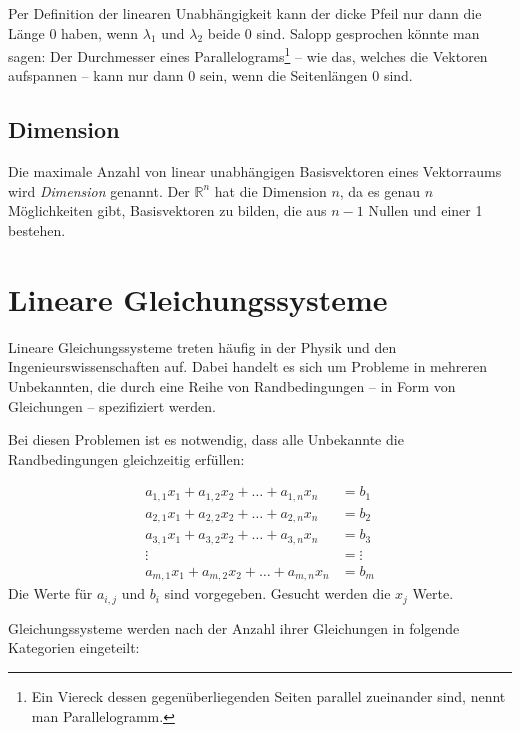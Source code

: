 \bigskip

Per Definition der linearen Unabhängigkeit kann der dicke Pfeil nur dann die Länge 0 haben, wenn $\lambda_1$ und $\lambda_2$ beide 0 sind. Salopp gesprochen könnte man sagen: Der Durchmesser eines Parallelograms\footnote{Ein Viereck dessen gegenüberliegenden Seiten parallel zueinander sind, nennt man Parallelogramm.} -- wie das, welches die Vektoren aufspannen -- kann nur dann 0 sein, wenn die Seitenlängen 0 sind.

\subsection{Dimension}

\begin{definition}
Die maximale Anzahl von linear unabhängigen Basisvektoren eines Vektorraums wird \textsl{Dimension} genannt. Der $\mathbb{R}^n$ hat die Dimension $n$, da es genau $n$ Möglichkeiten gibt, Basisvektoren zu bilden, die aus $n-1$ Nullen und einer 1 bestehen.
\end{definition}


\section{Lineare Gleichungssysteme}

Lineare Gleichungssysteme treten häufig in der Physik und den Ingenieurswissenschaften auf. Dabei handelt es sich um Probleme in mehreren Unbekannten, die durch eine Reihe von Randbedingungen -- in Form von Gleichungen -- spezifiziert werden.

Bei diesen Problemen ist es notwendig, dass alle Unbekannte die Randbedingungen gleichzeitig erfüllen:

\begin{equation}\label{eq:syseq}
\begin{split}
a_{1,1}x_1 + a_{1,2}x_2 + \dots + a_{1,n}x_n &= b_1 \\
a_{2,1}x_1 + a_{2,2}x_2 + \dots + a_{2,n}x_n &= b_2 \\
a_{3,1}x_1 + a_{3,2}x_2 + \dots + a_{3,n}x_n &= b_3 \\
\vdots &= \vdots \\
a_{m,1}x_1 + a_{m,2}x_2 + \dots + a_{m,n}x_n &= b_m 
\end{split}
\end{equation}
Die Werte für $a_{i,j}$ und $b_{i}$ sind vorgegeben. Gesucht werden die $x_j$ Werte. 

Gleichungssysteme werden nach der Anzahl ihrer Gleichungen in folgende Kategorien eingeteilt:

